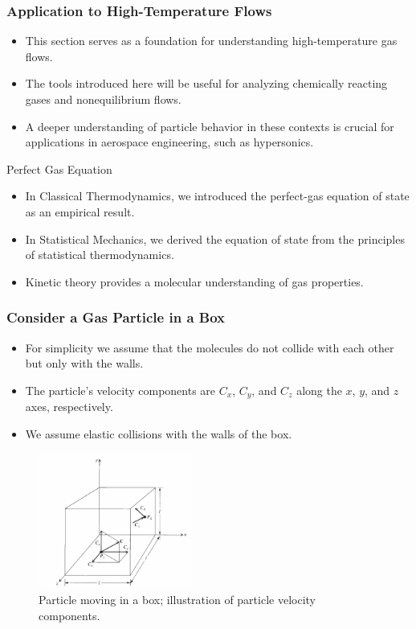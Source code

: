 \documentclass{beamer}
\begin{document}
\begin{frame}
\frametitle{Application to High-Temperature Flows}
\begin{itemize}
    \item This section serves as a foundation for understanding high-temperature gas flows.
    \item The tools introduced here will be useful for analyzing chemically reacting gases and nonequilibrium flows.
    \item A deeper understanding of particle behavior in these contexts is crucial for applications in aerospace engineering, such as hypersonics.
\end{itemize}
\end{frame}

\begin{frame}{Perfect Gas Equation}
    \begin{itemize}
        \item In Classical Thermodynamics, we introduced the perfect-gas equation of state as an empirical result. 
        \item In Statistical Mechanics, we derived the equation of state from the principles of statistical thermodynamics.
            \item Kinetic theory provides a molecular understanding of gas properties.
    \end{itemize}
\end{frame}

\begin{frame}
\frametitle{Consider a Gas Particle in a Box}
\begin{itemize}
    \item For simplicity we assume that the molecules do not collide with each other but only with the walls.
    \item The particle's velocity components are $C_x$, $C_y$, and $C_z$ along the $x$, $y$, and $z$ axes, respectively.
    \item We assume elastic collisions with the walls of the box.
\end{itemize}
\vskip-0.2cm
\begin{figure}
        \centering
        \includegraphics[width=0.45\textwidth]{box.png}
        \caption{Particle moving in a box; illustration of particle velocity components.}
    \end{figure}
\end{frame}
\end{document}
